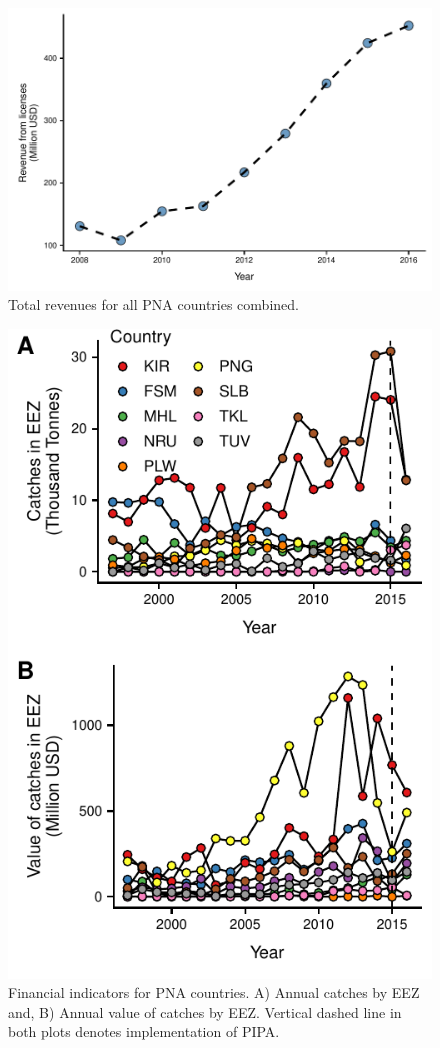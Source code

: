 \documentclass[9p,twocolumn,twoside,lineno]{pnas-new}
\begin{document}
\begin{figure}
\centering
	\includegraphics{img/total_PNA_revenues.pdf}
	\caption{\label{fig:total_PNA_revenues}Total revenues for all PNA countries combined.}
\end{figure}

\begin{figure}
\centering
	\includegraphics{img/catches.pdf}
	\caption{\label{fig:catches}Financial indicators for PNA countries. A) Annual catches by EEZ and, B) Annual value of catches by EEZ. Vertical dashed line in both plots denotes implementation of PIPA.}
\end{figure}
\end{document}
